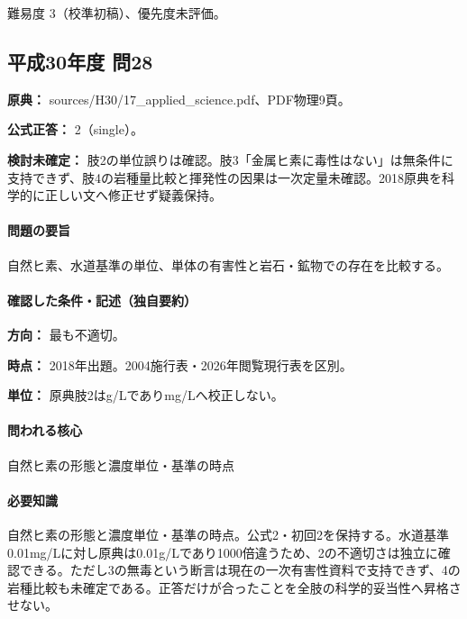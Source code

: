 \par 難易度 3（校準初稿）、優先度未評価。

\subsection{平成30年度 問28}
\label{q:h30-reg-applied-28}

\noindent\textbf{原典：} sources/H30/17\_applied\_science.pdf、PDF物理9頁。

\textbf{公式正答：} 2（single）。

\par\textbf{検討未確定：} 肢2の単位誤りは確認。肢3「金属ヒ素に毒性はない」は無条件に支持できず、肢4の岩種量比較と揮発性の因果は一次定量未確認。2018原典を科学的に正しい文へ修正せず疑義保持。

\paragraph{問題の要旨} 自然ヒ素、水道基準の単位、単体の有害性と岩石・鉱物での存在を比較する。

\paragraph{確認した条件・記述（独自要約）}\mbox{}\par

\noindent\textbf{方向：} 最も不適切。\par

\noindent\textbf{時点：} 2018年出題。2004施行表・2026年閲覧現行表を区別。\par

\noindent\textbf{単位：} 原典肢2はg/Lでありmg/Lへ校正しない。\par

\paragraph{問われる核心} 自然ヒ素の形態と濃度単位・基準の時点

\paragraph{必要知識} 自然ヒ素の形態と濃度単位・基準の時点。公式2・初回2を保持する。水道基準0.01mg/Lに対し原典は0.01g/Lであり1000倍違うため、2の不適切さは独立に確認できる。ただし3の無毒という断言は現在の一次有害性資料で支持できず、4の岩種比較も未確定である。正答だけが合ったことを全肢の科学的妥当性へ昇格させない。


